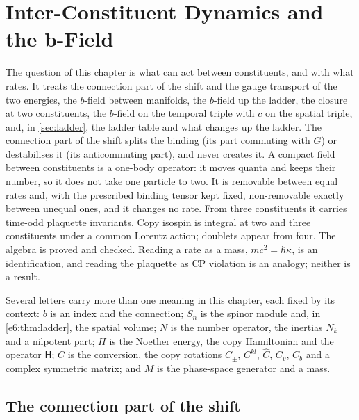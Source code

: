 \chapter{Inter-Constituent Dynamics and the b-Field}
\label{ch:ch09_bfield}

The question of this chapter is what can act between constituents, and with what rates. It treats the connection part of the
shift and the gauge transport of the two energies, the $b$-field between manifolds, the $b$-field up the ladder, the closure at two
constituents, the $b$-field on the temporal triple with $c$ on the spatial triple, and, in \cref{sec:ladder}, the ladder table and what changes
up the ladder. The connection part of the shift splits the binding (its part commuting with $G$) or destabilises it (its anticommuting part),
and never creates it. A compact field between constituents is a one-body operator: it moves quanta and keeps their number, so it does not
take one particle to two. It is removable between equal rates and, with the prescribed binding tensor kept fixed, non-removable exactly between unequal ones, and it changes no rate. From three
constituents it carries time-odd plaquette invariants. Copy isospin is integral at two and three constituents under a common Lorentz action;
doublets appear from four. The algebra is proved and checked. Reading a rate as a mass, $mc^2=\hbar\kappa$, is an identification, and reading the
plaquette as CP violation is an analogy; neither is a result.

Several letters carry more than one meaning in this chapter, each fixed by its context: $b$ is an index and the connection; $S_n$ is the spinor
module and, in \cref{e6:thm:ladder}, the spatial volume; $N$ is the number operator, the inertias $N_k$ and a nilpotent part; $H$ is the Noether
energy, the copy Hamiltonian and the operator $\mathsf H$; $C$ is the conversion, the copy rotations $C_\pm$, $C^{kl}$, $\hat C$, $C_v$, $C_b$ and a complex
symmetric matrix; and $M$ is the phase-space generator and a mass.



\section{The connection part of the shift}
\label{sec:bfield}


